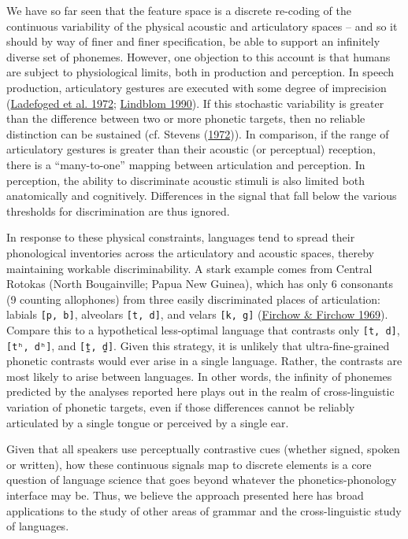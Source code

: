 \documentclass[
]{article}
\begin{document}
We have so far seen that the feature space is a discrete re-coding of
the continuous variability of the physical acoustic and articulatory
spaces -- and so it should by way of finer and finer specification, be
able to support an infinitely diverse set of phonemes. However, one
objection to this account is that humans are subject to physiological
limits, both in production and perception. In speech production,
articulatory gestures are executed with some degree of imprecision
(\protect\hyperlink{ref-Ladefoged_etal1972}{Ladefoged et al. 1972};
\protect\hyperlink{ref-Lindblom1990}{Lindblom 1990}). If this stochastic
variability is greater than the difference between two or more phonetic
targets, then no reliable distinction can be sustained (cf. Stevens
(\protect\hyperlink{ref-Stevens1972}{1972})). In comparison, if the
range of articulatory gestures is greater than their acoustic (or
perceptual) reception, there is a ``many-to-one'' mapping between
articulation and perception. In perception, the ability to discriminate
acoustic stimuli is also limited both anatomically and cognitively.
Differences in the signal that fall below the various thresholds for
discrimination are thus ignored.

In response to these physical constraints, languages tend to spread
their phonological inventories across the articulatory and acoustic
spaces, thereby maintaining workable discriminability. A stark example
comes from Central Rotokas (North Bougainville; Papua New Guinea), which
has only 6 consonants (9 counting allophones) from three easily
discriminated places of articulation: labials \texttt{{[}p,\ b{]}},
alveolars \texttt{{[}t,\ d{]}}, and velars \texttt{{[}k,\ g{]}}
(\protect\hyperlink{ref-FirchowFirchow1969}{Firchow \& Firchow 1969}).
Compare this to a hypothetical less-optimal language that contrasts only
\texttt{{[}t,\ d{]}}, \texttt{{[}tʰ,\ dʰ{]}}, and \texttt{{[}t̪,\ d̪{]}}.
Given this strategy, it is unlikely that ultra-fine-grained phonetic
contrasts would ever arise in a single language. Rather, the contrasts
are most likely to arise between languages. In other words, the infinity
of phonemes predicted by the analyses reported here plays out in the
realm of cross-linguistic variation of phonetic targets, even if those
differences cannot be reliably articulated by a single tongue or
perceived by a single ear.

Given that all speakers use perceptually contrastive cues (whether
signed, spoken or written), how these continuous signals map to discrete
elements is a core question of language science that goes beyond
whatever the phonetics-phonology interface may be. Thus, we believe the
approach presented here has broad applications to the study of other
areas of grammar and the cross-linguistic study of languages.
\end{document}
